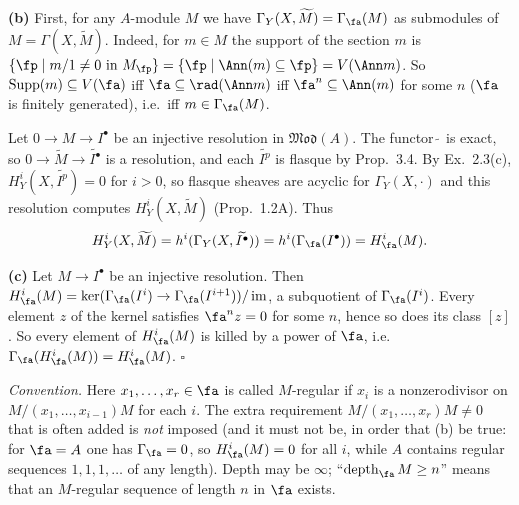 \documentclass[11pt]{article}
\begin{document}
\textbf{(b)} First, for any $A$-module $M$ we have $\Gamma_Y(X,\widetilde M)=\Gamma_{\fa}(M)$ as submodules of $M=\Gamma(X,\widetilde M)$. Indeed, for $m\in M$ the support of the section $m$ is $\{\fp\mid m/1\neq0\text{ in }M_{\fp}\}=\{\fp\mid\Ann(m)\subseteq\fp\}=V(\Ann m)$. So $\operatorname{Supp}(m)\subseteq V(\fa)$ iff $\fa\subseteq\rad(\Ann m)$ iff $\fa^n\subseteq\Ann(m)$ for some $n$ ($\fa$ is finitely generated), i.e.\ iff $m\in\Gamma_{\fa}(M)$.

Let $0\to M\to I^\bullet$ be an injective resolution in $\mathfrak{Mod}(A)$. The functor $\widetilde{\ }$ is exact, so $0\to\widetilde M\to\widetilde{I^\bullet}$ is a resolution, and each $\widetilde{I^p}$ is flasque by Prop.~3.4. By Ex.~2.3(c), $H^i_Y(X,\widetilde{I^p})=0$ for $i>0$, so flasque sheaves are acyclic for $\Gamma_Y(X,\cdot)$ and this resolution computes $H^i_Y(X,\widetilde M)$ (Prop.~1.2A). Thus
\[
H^i_Y(X,\widetilde M)=h^i(\Gamma_Y(X,\widetilde{I^\bullet}))=h^i(\Gamma_{\fa}(I^\bullet))=H^i_{\fa}(M).
\]

\textbf{(c)} Let $M\to I^\bullet$ be an injective resolution. Then $H^i_{\fa}(M)=\ker(\Gamma_{\fa}(I^i)\to\Gamma_{\fa}(I^{i+1}))/\operatorname{im}$, a subquotient of $\Gamma_{\fa}(I^i)$. Every element $z$ of the kernel satisfies $\fa^nz=0$ for some $n$, hence so does its class $[z]$. So every element of $H^i_{\fa}(M)$ is killed by a power of $\fa$, i.e.\ $\Gamma_{\fa}(H^i_{\fa}(M))=H^i_{\fa}(M)$. \hfill$\square$

\pf
\emph{Convention.} Here $x_1,\dots,x_r\in\fa$ is called $M$-regular if $x_i$ is a nonzerodivisor on $M/(x_1,\dots,x_{i-1})M$ for each $i$. The extra requirement $M/(x_1,\dots,x_r)M\neq0$ that is often added is \emph{not} imposed (and it must not be, in order that (b) be true: for $\fa=A$ one has $\Gamma_{\fa}=0$, so $H^i_{\fa}(M)=0$ for all $i$, while $A$ contains regular sequences $1,1,1,\dots$ of any length). Depth may be $\infty$; ``$\operatorname{depth}_{\fa}M\ge n$'' means that an $M$-regular sequence of length $n$ in $\fa$ exists.
\end{document}

